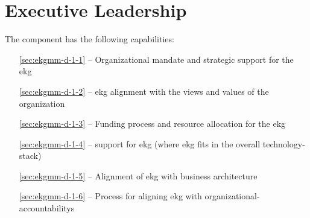 \chapter{Executive Leadership}\label{ch:ekgmm-d-1}

The  component has the following capabilities:

\begin{itemize}[leftmargin=.5in]
  \item [\ref{sec:ekgmm-d-1-1}]  -- Organizational mandate and strategic support for the \gls{ekg}
  \item [\ref{sec:ekgmm-d-1-2}]  -- \gls{ekg} alignment with the views and values of the organization
  \item [\ref{sec:ekgmm-d-1-3}]  -- Funding process and resource allocation for the \gls{ekg}
  \item [\ref{sec:ekgmm-d-1-4}]  --  support for \gls{ekg} (where \gls{ekg} fits in the overall \gls{technology-stack})
  \item [\ref{sec:ekgmm-d-1-5}]  -- Alignment of \gls{ekg} with business architecture
  \item [\ref{sec:ekgmm-d-1-6}]  -- Process for aligning \gls{ekg} with \glspl{organizational-accountability}
\end{itemize}







